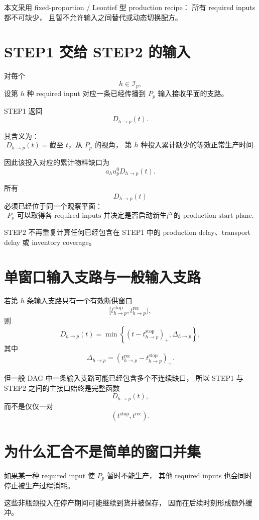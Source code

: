 \documentclass[UTF8,11pt]{ctexart}
\begin{document}
本文采用 fixed-proportion / Leontief 型 production recipe：
所有 required inputs 都不可缺少，
且暂不允许输入之间替代或动态切换配方。

\section{STEP1 交给 STEP2 的输入}

对每个
\[
h\in\mathcal I_p,
\]
设第 \(h\) 种 required input 对应一条已经传播到 \(P_p\) 输入接收平面的支路。

STEP1 返回
\[
\boxed{
D_{h\to p}(t).
}
\tag{5}
\]

其含义为：
\[
\boxed{
D_{h\to p}(t)
=
\text{截至 \(t\)，从 \(P_p\) 的视角，
第 \(h\) 种投入累计缺少的等效正常生产时间}.
}
\]

因此该投入对应的累计物料缺口为
\[
\boxed{
a_hu_p^0D_{h\to p}(t).
}
\tag{6}
\]

所有
\[
D_{h\to p}(t)
\]
必须已经位于同一个观察平面：
\[
\boxed{
\text{\(P_p\) 可以取得各 required inputs
并决定是否启动新生产的 production-start plane}.
}
\]

STEP2 不再重复计算任何已经包含在 STEP1 中的
production delay、transport delay 或 inventory coverage。

\section{单窗口输入支路与一般输入支路}

若第 \(h\) 条输入支路只有一个有效断供窗口
\[
[t_{h\to p}^{\mathrm{stop}},
t_{h\to p}^{\mathrm{rec}}),
\]
则
\[
\boxed{
D_{h\to p}(t)
=
\min\left\{
(t-t_{h\to p}^{\mathrm{stop}})_+,
\Delta_{h\to p}
\right\},
}
\tag{7}
\]
其中
\[
\boxed{
\Delta_{h\to p}
=
\left(
t_{h\to p}^{\mathrm{rec}}
-
t_{h\to p}^{\mathrm{stop}}
\right)_+.
}
\tag{8}
\]

但一般 DAG 中一条输入支路可能已经包含多个不连续缺口，
所以 STEP1 与 STEP2 之间的主接口始终是完整函数
\[
\boxed{D_{h\to p}(t),}
\]
而不是仅仅一对
\[
(t^{\mathrm{stop}},t^{\mathrm{rec}}).
\]

\section{为什么汇合不是简单的窗口并集}

如果某一种 required input 使 \(P_p\) 暂时不能生产，
其他 required inputs 也会同时停止被生产过程消耗。

这些非瓶颈投入在停产期间可能继续到货并被保存，
因而在后续时刻形成额外缓冲。
\end{document}
